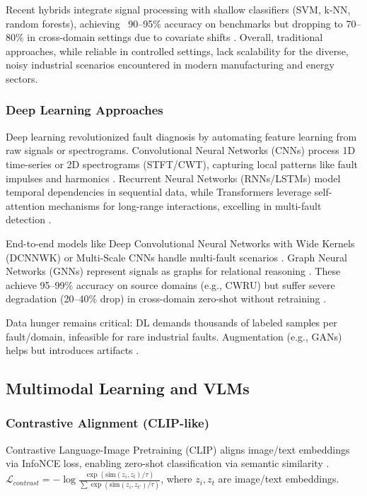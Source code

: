 Recent hybrids integrate signal processing with shallow classifiers (SVM, k-NN, random forests), achieving ~90--95\% accuracy on benchmarks but dropping to 70--80\% in cross-domain settings due to covariate shifts \cite{li2021mmd}. Overall, traditional approaches, while reliable in controlled settings, lack scalability for the diverse, noisy industrial scenarios encountered in modern manufacturing and energy sectors.

\subsubsection{Deep Learning Approaches}
Deep learning revolutionized fault diagnosis by automating feature learning from raw signals or spectrograms. Convolutional Neural Networks (CNNs) process 1D time-series or 2D spectrograms (STFT/CWT), capturing local patterns like fault impulses and harmonics \cite{jia2016deep,verstraete2020cnn}. Recurrent Neural Networks (RNNs/LSTMs) model temporal dependencies in sequential data, while Transformers leverage self-attention mechanisms for long-range interactions, excelling in multi-fault detection \cite{li2022transformer}.

End-to-end models like Deep Convolutional Neural Networks with Wide Kernels (DCNNWK) or Multi-Scale CNNs handle multi-fault scenarios \cite{wen2022maml}. Graph Neural Networks (GNNs) represent signals as graphs for relational reasoning \cite{li2023gnn}. These achieve 95--99\% accuracy on source domains (e.g., CWRU) but suffer severe degradation (20--40\% drop) in cross-domain zero-shot without retraining \cite{wang2020transfer,hoang2023vit}.

Data hunger remains critical: DL demands thousands of labeled samples per fault/domain, infeasible for rare industrial faults. Augmentation (e.g., GANs) helps but introduces artifacts \cite{hoang2023vit}.

\subsection{Multimodal Learning and VLMs}
\subsubsection{Contrastive Alignment (CLIP-like)}
Contrastive Language-Image Pretraining (CLIP) aligns image/text embeddings via InfoNCE loss, enabling zero-shot classification via semantic similarity \cite{radford2021clip}. $\mathcal{L}_{contrast} = -\log \frac{\exp(\mathrm{sim}(z_i, z_t)/\tau)}{\sum \exp(\mathrm{sim}(z_i, z_{t'})/\tau)}$, where $z_i, z_t$ are image/text embeddings.

